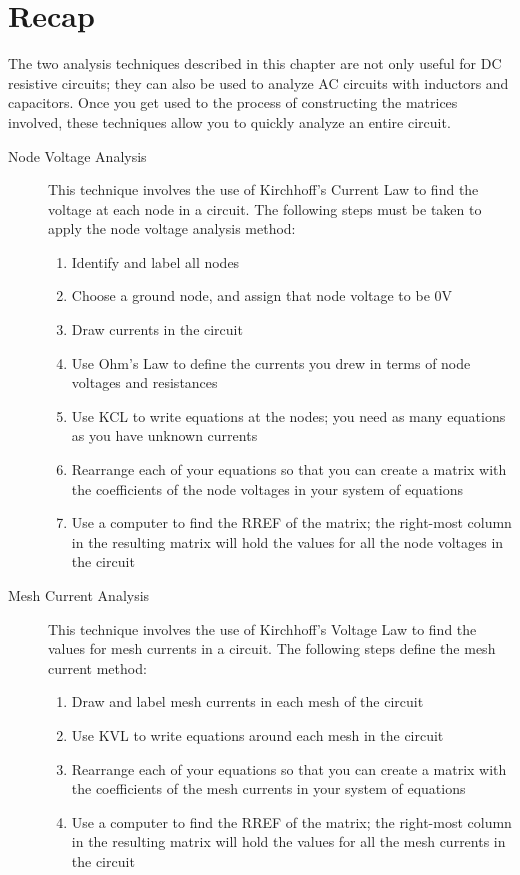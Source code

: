 \section{Recap}
The two analysis techniques described in this chapter are not only useful for DC resistive circuits; they can also be used to analyze AC circuits with inductors and capacitors. Once you get used to the process of constructing the matrices involved, these techniques allow you to quickly analyze an entire circuit.
\begin{description}
\item[Node Voltage Analysis] This technique involves the use of Kirchhoff's Current Law to find the voltage at each node in a circuit. The following steps must be taken to apply the node voltage analysis method:
\begin{enumerate}
\item Identify and label all nodes
\item Choose a ground node, and assign that node voltage to be 0V
\item Draw currents in the circuit
\item Use Ohm's Law to define the currents you drew in terms of node voltages and resistances
\item Use KCL to write equations at the nodes; you need as many equations as you have unknown currents
\item Rearrange each of your equations so that you can create a matrix with the coefficients of the node voltages in your system of equations
\item Use a computer to find the RREF of the matrix; the right-most column in the resulting matrix will hold the values for all the node voltages in the circuit
\end{enumerate}

\item[Mesh Current Analysis] This technique involves the use of Kirchhoff's Voltage Law to find the values for mesh currents in a circuit. The following steps define the mesh current method:
\begin{enumerate}
\item Draw and label mesh currents in each mesh of the circuit
\item Use KVL to write equations around each mesh in the circuit
\item Rearrange each of your equations so that you can create a matrix with the coefficients of the mesh currents in your system of equations
\item Use a computer to find the RREF of the matrix; the right-most column in the resulting matrix will hold the values for all the mesh currents in the circuit
\end{enumerate}
\end{description}
